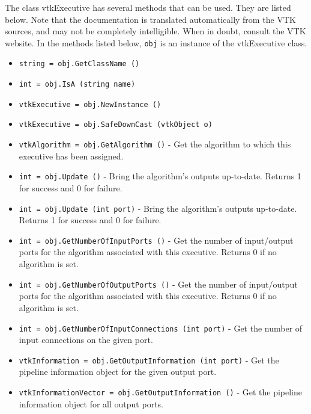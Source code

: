The class vtkExecutive has several methods that can be used.
  They are listed below.
Note that the documentation is translated automatically from the VTK sources,
and may not be completely intelligible.  When in doubt, consult the VTK website.
In the methods listed below, \verb|obj| is an instance of the vtkExecutive class.
\begin{itemize}
\item  \verb|string = obj.GetClassName ()|

\item  \verb|int = obj.IsA (string name)|

\item  \verb|vtkExecutive = obj.NewInstance ()|

\item  \verb|vtkExecutive = obj.SafeDownCast (vtkObject o)|

\item  \verb|vtkAlgorithm = obj.GetAlgorithm ()| -  Get the algorithm to which this executive has been assigned.

\item  \verb|int = obj.Update ()| -  Bring the algorithm's outputs up-to-date.  Returns 1 for success
 and 0 for failure.

\item  \verb|int = obj.Update (int port)| -  Bring the algorithm's outputs up-to-date.  Returns 1 for success
 and 0 for failure.

\item  \verb|int = obj.GetNumberOfInputPorts ()| -  Get the number of input/output ports for the algorithm associated
 with this executive.  Returns 0 if no algorithm is set.

\item  \verb|int = obj.GetNumberOfOutputPorts ()| -  Get the number of input/output ports for the algorithm associated
 with this executive.  Returns 0 if no algorithm is set.

\item  \verb|int = obj.GetNumberOfInputConnections (int port)| -  Get the number of input connections on the given port.

\item  \verb|vtkInformation = obj.GetOutputInformation (int port)| -  Get the pipeline information object for the given output port.

\item  \verb|vtkInformationVector = obj.GetOutputInformation ()| -  Get the pipeline information object for all output ports.


\end{itemize}
